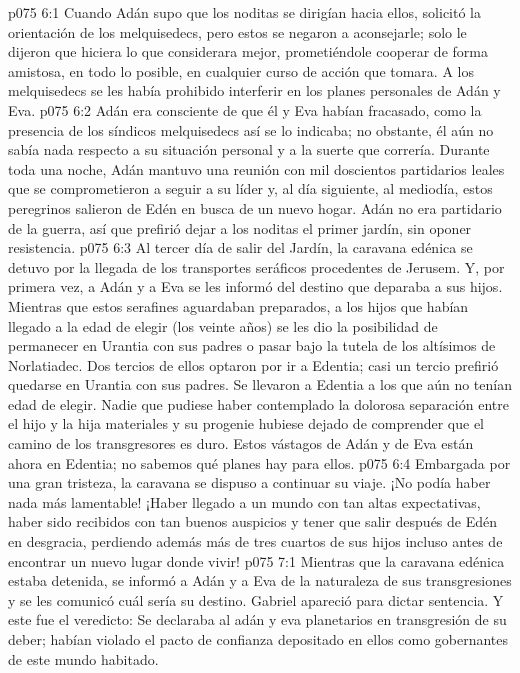 \vs p075 6:1 Cuando Adán supo que los noditas se dirigían hacia ellos, solicitó la orientación de los melquisedecs, pero estos se negaron a aconsejarle; solo le dijeron que hiciera lo que considerara mejor, prometiéndole cooperar de forma amistosa, en todo lo posible, en cualquier curso de acción que tomara. A los melquisedecs se les había prohibido interferir en los planes personales de Adán y Eva.
\vs p075 6:2 Adán era consciente de que él y Eva habían fracasado, como la presencia de los síndicos melquisedecs así se lo indicaba; no obstante, él aún no sabía nada respecto a su situación personal y a la suerte que correría. Durante toda una noche, Adán mantuvo una reunión con mil doscientos partidarios leales que se comprometieron a seguir a su líder y, al día siguiente, al mediodía, estos peregrinos salieron de Edén en busca de un nuevo hogar. Adán no era partidario de la guerra, así que prefirió dejar a los noditas el primer jardín, sin oponer resistencia.
\vs p075 6:3 Al tercer día de salir del Jardín, la caravana edénica se detuvo por la llegada de los transportes seráficos procedentes de Jerusem. Y, por primera vez, a Adán y a Eva se les informó del destino que deparaba a sus hijos. Mientras que estos serafines aguardaban preparados, a los hijos que habían llegado a la edad de elegir (los veinte años) se les dio la posibilidad de permanecer en Urantia con sus padres o pasar bajo la tutela de los altísimos de Norlatiadec. Dos tercios de ellos optaron por ir a Edentia; casi un tercio prefirió quedarse en Urantia con sus padres. Se llevaron a Edentia a los que aún no tenían edad de elegir. Nadie que pudiese haber contemplado la dolorosa separación entre el hijo y la hija materiales y su progenie hubiese dejado de comprender que el camino de los transgresores es duro. Estos vástagos de Adán y de Eva están ahora en Edentia; no sabemos qué planes hay para ellos.
\vs p075 6:4 Embargada por una gran tristeza, la caravana se dispuso a continuar su viaje. ¡No podía haber nada más lamentable! ¡Haber llegado a un mundo con tan altas expectativas, haber sido recibidos con tan buenos auspicios y tener que salir después de Edén en desgracia, perdiendo además más de tres cuartos de sus hijos incluso antes de encontrar un nuevo lugar donde vivir!
\vs p075 7:1 Mientras que la caravana edénica estaba detenida, se informó a Adán y a Eva de la naturaleza de sus transgresiones y se les comunicó cuál sería su destino. Gabriel apareció para dictar sentencia. Y este fue el veredicto: Se declaraba al adán y eva planetarios en transgresión de su deber; habían violado el pacto de confianza depositado en ellos como gobernantes de este mundo habitado.
